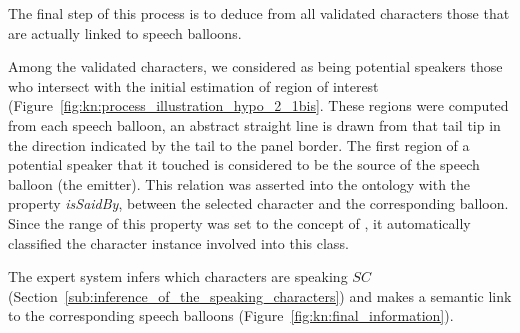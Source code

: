 The final step of this process is to deduce from all validated characters those that are actually linked to speech balloons.

Among the validated characters, we considered as being potential speakers those who intersect with the initial estimation of region of interest (Figure~\ref{fig:kn:process_illustration_hypo_2_1bis}.
These regions were computed from each speech balloon, an abstract straight line is drawn from that tail tip in the direction indicated by the tail to the panel border.
The first region of a potential speaker that it touched is considered to be the source of the speech balloon (the emitter).
This relation was asserted into the ontology with the property \textit{isSaidBy}, between the selected character and the corresponding balloon.
Since the range of this property was set to the concept of , it automatically classified the character instance involved into this class.

The expert system infers which characters are speaking $SC$ (Section~\ref{sub:inference_of_the_speaking_characters}) and makes a semantic link to the corresponding speech balloons (Figure~\ref{fig:kn:final_information}).


